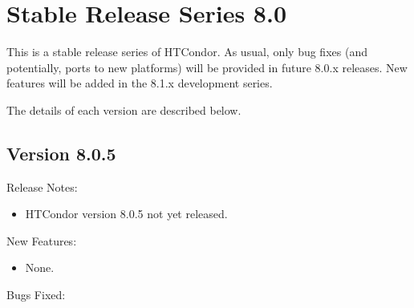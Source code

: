 
\section{\label{sec:History-8-0}Stable Release Series 8.0}

This is a stable release series of HTCondor.
As usual, only bug fixes (and potentially, ports to new platforms)
will be provided in future 8.0.x releases.
New features will be added in the 8.1.x development series.

The details of each version are described below.

\subsection*{\label{sec:New-8-0-5}Version 8.0.5}

\noindent Release Notes:

\begin{itemize}

\item HTCondor version 8.0.5 not yet released.

\end{itemize}


\noindent New Features:

\begin{itemize}

\item None.

\end{itemize}

\noindent Bugs Fixed:

